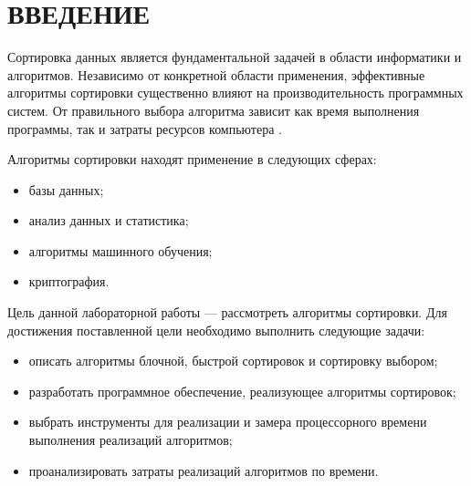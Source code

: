 \chapter*{ВВЕДЕНИЕ}

Сортировка данных является фундаментальной задачей в области информатики и алгоритмов. 
Независимо от конкретной области применения, эффективные алгоритмы сортировки существенно влияют на производительность программных систем. 
От правильного выбора алгоритма зависит как время выполнения программы, так и затраты ресурсов компьютера \cite{knut}.

Алгоритмы сортировки находят применение в следующих сферах:
\begin{itemize}
	\item базы данных;
	\item анализ данных и статистика;
	\item алгоритмы машинного обучения;
	\item криптография.
\end{itemize}

Цель данной лабораторной работы --- рассмотреть алгоритмы сортировки.
Для достижения поставленной цели необходимо выполнить следующие задачи:
\begin{itemize}
	\item описать алгоритмы блочной, быстрой сортировок и сортировку выбором;
	\item разработать программное обеспечение, реализующее алгоритмы сортировок;
	\item выбрать инструменты для реализации и замера процессорного времени
	выполнения реализаций алгоритмов;
	\item проанализировать затраты реализаций алгоритмов по времени.
\end{itemize}
